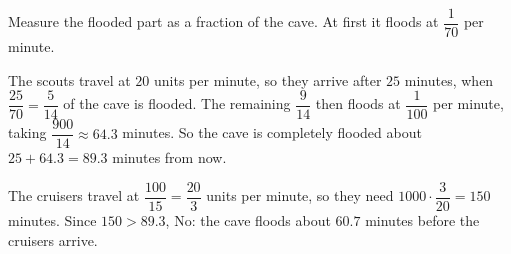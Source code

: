 Measure the flooded part as a fraction of the cave. At first it floods at $\dfrac{1}{70}$ per minute.

The scouts travel at $20$ units per minute, so they arrive after $25$ minutes, when $\dfrac{25}{70}=\dfrac{5}{14}$ of the cave is flooded. The remaining $\dfrac{9}{14}$ then floods at $\dfrac{1}{100}$ per minute, taking $\dfrac{900}{14}\approx64.3$ minutes. So the cave is completely flooded about $25+64.3=89.3$ minutes from now.

The cruisers travel at $\dfrac{100}{15}=\dfrac{20}{3}$ units per minute, so they need $1000\cdot\dfrac{3}{20}=150$ minutes. Since $150>89.3$, $\boxed{\text{No}}$: the cave floods about $60.7$ minutes before the cruisers arrive.
